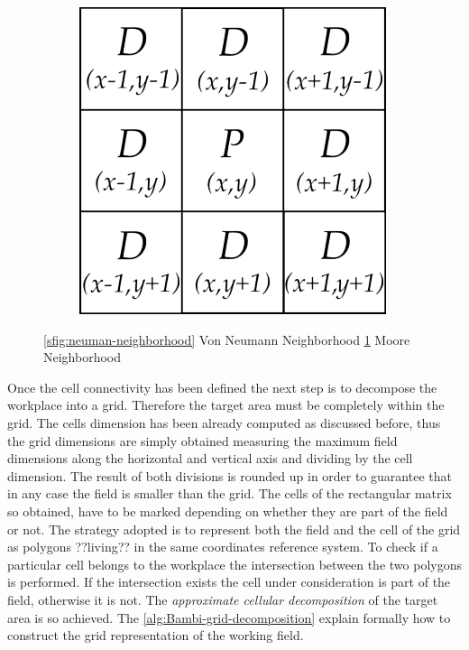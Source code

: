\begin{figure}[ht]
\begin{subfigure}{.3\textwidth}
  \includegraphics[width=.9\linewidth]{figures/C3/moore-neighborhood.png}
  \caption{}
  \label{sfig:moore-neighborhood}
\end{subfigure}
\caption{\ref{sfig:neuman-neighborhood} Von Neumann Neighborhood \ref{sfig:moore-neighborhood} Moore Neighborhood}
\label{fig:neighborhood}
\end{figure}

Once the cell connectivity has been defined the next step is to decompose the workplace into a grid. Therefore the target area must be completely within the grid. The cells dimension has been already computed as discussed before, thus the grid dimensions are simply obtained measuring the maximum field dimensions along the horizontal and vertical axis and dividing by the cell dimension. The result of both divisions is rounded up in order to guarantee that in any case the field is smaller than the grid. The cells of the rectangular matrix so obtained, have to be marked depending on whether they are part of the field or not. The strategy adopted is to represent both the field and the cell of the grid as polygons ??living?? in the same coordinates reference system. To check if a particular cell belongs to the workplace the intersection between the two polygons is performed. If the intersection exists the cell under consideration is part of the field, otherwise it is not. The \textit{approximate cellular decomposition} of the target area is so achieved. The \autoref{alg:Bambi-grid-decomposition} explain formally how to construct the grid representation of the working field.


